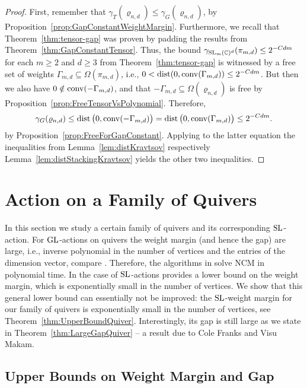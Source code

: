 \begin{proof}
	First, remember that $\gamma_{T}(\varrho_{n,d}) \leq \gamma_{G}(\varrho_{n,d})$, by Proposition~\ref{prop:GapConstantWeightMargin}.
	Furthermore, we recall that Theorem~\ref{thm:tensor-gap} was proven by padding the results from Theorem~\ref{thm:GapConstantTensor}. Thus,  the bound $\gamma_{\operatorname{SL}_m(\mathbb C)^d}(\pi_{m,d}) \leq 2^{-Cdm}$ for each $m \geq 2$ and $d \geq 3$ from Theorem~\ref{thm:tensor-gap} is witnessed by a free set of weights $\Gamma_{m,d} \subseteq \Omega(\pi_{m,d})$, i.e., $0 < \operatorname{dist}(0, \operatorname{conv}(\Gamma_{m,d}) ) \leq 2^{-C d m}$. But then we also have $0 \notin \operatorname{conv}(-\Gamma_{m,d})$, and that $-\Gamma_{m,d} \subseteq \Omega(\varrho_{n,d})$ is free by Proposition~\ref{prop:FreeTensorVsPolynomial}. Therefore,
	\begin{align*}
		\gamma_{G}(\varrho_{n,d}) \leq \operatorname{dist} \big(0, \operatorname{conv}(-\Gamma_{m,d}) \big) = \operatorname{dist} \big(0, \operatorname{conv}(\Gamma_{m,d}) \big) \leq 2^{-C d m}.
	\end{align*}
 	by Proposition~\ref{prop:FreeForGapConstant}.
	Applying to the latter equation the inequalities from Lemma~\ref{lem:distKravtsov} respectively Lemma~\ref{lem:distStackingKravtsov} yields the other two inequalities.
\end{proof}




\section{Action on a Family of Quivers} \label{sec:QuiversGap}

In this section we study a certain family of quivers and its corresponding $\operatorname{SL}$-action. For $\operatorname{GL}$-actions on quivers the weight margin (and hence the gap) are large, i.e., inverse polynomial in the number of vertices and the entries of the dimension vector, compare \cite[Theorem~6.21 Item~2]{GradflowArXiv}. Therefore, the algorithms in \cite{GradflowArXiv} solve NCM in polynomial time. In the case of $\operatorname{SL}$-actions \cite[Theorem~6.21 Item~4]{GradflowArXiv} provides a lower bound on the weight margin, which is exponentially small in the number of vertices. We show that this general lower bound can essentially not be improved: the $\operatorname{SL}$-weight margin for our family of quivers is exponentially small in the number of vertices, see Theorem~\ref{thm:UpperBoundQuiver}. Interestingly, its gap is still large as we state in Theorem~\ref{thm:LargeGapQuiver} -- a result due to Cole Franks and Visu Makam.


\subsection{Upper Bounds on Weight Margin and Gap} \label{subsec:QuiverUpperBound}


